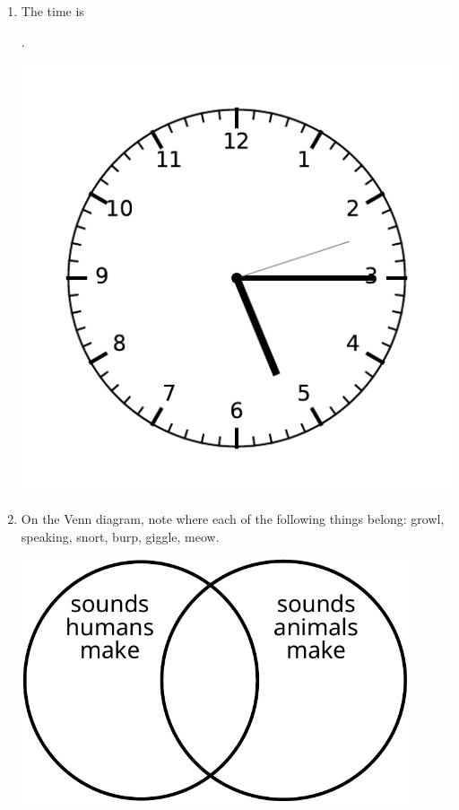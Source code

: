 \documentclass{tufte-book}
\begin{document}
\begin{enumerate}
\item The time is \dotfill\bigskip\par\dotfill\bigskip.
\begin{marginfigure}\includegraphics[width=\textwidth]{maths/fig/clock_0515.pdf}\end{marginfigure}

\item On the Venn diagram, note where each of the following things belong:
growl, speaking, snort, burp, giggle, meow.

\includegraphics[width=0.9\textwidth]{maths/fig/venn_sounds.pdf}

\end{enumerate}
\end{document}
